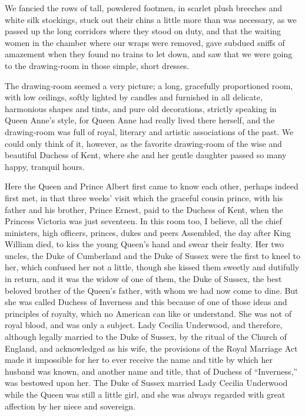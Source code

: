 \documentclass[12pt]{book}
\begin{document}
We fancied the rows of tall, powdered footmen, in scarlet plush breeches and
white silk stockings, stuck out their chins a little more than was necessary, as
we passed up the long corridors where they stood on duty, and that the waiting
women in the chamber where our wraps were removed, gave subdued sniffs of
amazement when they found no trains to let down, and saw that we were going
to the drawing‐room in those simple, short dresses.

The drawing‐room seemed a very picture; a long, gracefully proportioned
room, with low ceilings, softly lighted by candles and furnished in all delicate,
harmonious shapes and tints, and pure old decorations, strictly speaking in Queen
Anne’s style, for Queen Anne had really lived there herself, and the drawing‐room
was full of royal, literary and artistic associations of the past. We could only think
of it, however, as the favorite drawing‐room of the wise and beautiful Duchess of
Kent, where she and her gentle daughter passed so many happy, tranquil hours.

Here the Queen and Prince Albert first came to know each other, perhaps
indeed first met, in that three weeks’ visit which the graceful cousin prince, with
his father and his brother, Prince Ernest, paid to the Duchess of Kent, when the
Princess Victoria was just seventeen. In this room too, I believe, all the chief
ministers, high officers, princes, dukes and peers Assembled, the day after King
William died, to kiss the young Queen’s hand and swear their fealty. Her two
uncles, the Duke of Cumberland and the Duke of Sussex were the first to kneel to
her, which confused her not a little, though she kissed them sweetly and dutifully
in return, and it was the widow of one of them, the Duke of Sussex, the best
beloved brother of the Queen’s father, with whom we had now come to dine. But
she was called Duchess of Inverness and this because of one of those ideas and
principles of royalty, which no American can like or understand. She was not
of royal blood, and was only a subject. Lady Cecilia Underwood, and therefore,
although legally married to the Duke of Sussex, by the ritual of the Church of
England, and acknowledged as his wife, the provisions of the Royal Marriage
Act made it impossible for her to ever receive the name and title by which her
husband was known, and another name and title, that of Duchess of “Inverness,”
was bestowed upon her. The Duke of Sussex married Lady Cecilia Underwood
while the Queen was still a little girl, and she was always regarded with great
affection by her niece and sovereign.
\end{document}
